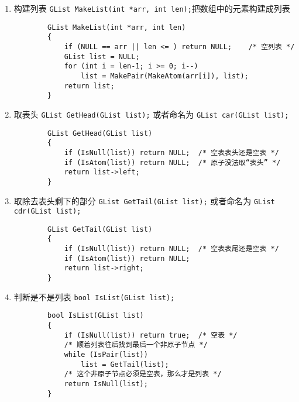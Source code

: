 \documentclass{ctexart}
\begin{document}
\begin{enumerate}
    \item 构建列表 \texttt{GList MakeList(int *arr, int len);}把数组中的元素构建成列表
        \begin{verbatim}
        GList MakeList(int *arr, int len)
        {
            if (NULL == arr || len <= ) return NULL;    /* 空列表 */
            GList list = NULL;
            for (int i = len-1; i >= 0; i--)
                list = MakePair(MakeAtom(arr[i]), list);
            return list;
        }
        \end{verbatim}

    \item 取表头 \texttt{GList GetHead(GList list);} 或者命名为 \texttt{GList car(GList list);}
        \begin{verbatim}
        GList GetHead(GList list)
        {
            if (IsNull(list)) return NULL;  /* 空表表头还是空表 */
            if (IsAtom(list)) return NULL;  /* 原子没法取“表头” */
            return list->left;
        }
        \end{verbatim}

    \item 取除去表头剩下的部分 \texttt{GList GetTail(GList list);} 或者命名为 \texttt{GList cdr(GList list);}
        \begin{verbatim}
        GList GetTail(GList list)
        {
            if (IsNull(list)) return NULL;  /* 空表表尾还是空表 */
            if (IsAtom(list)) return NULL;
            return list->right;
        }
        \end{verbatim}


    \item 判断是不是列表 \texttt{bool IsList(GList list);}
        \begin{verbatim}
        bool IsList(GList list)
        {
            if (IsNull(list)) return true;  /* 空表 */
            /* 顺着列表往后找到最后一个非原子节点 */
            while (IsPair(list))
                list = GetTail(list);
            /* 这个非原子节点必须是空表，那么才是列表 */
            return IsNull(list);
        }
        \end{verbatim}

\end{enumerate}
\end{document}
